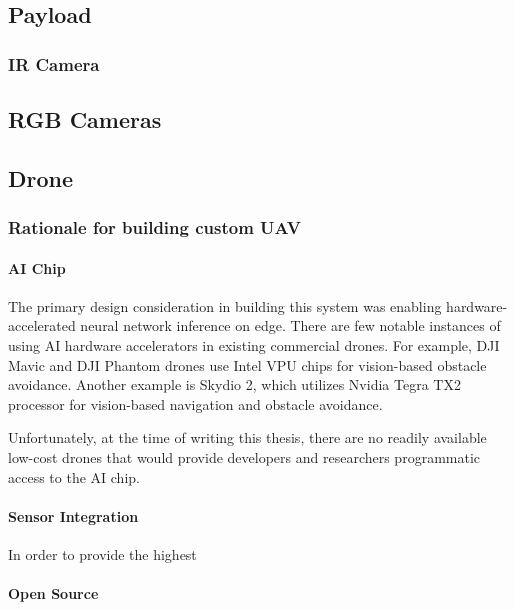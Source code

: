   \subsection{Payload}\label{sec:hardware:payload}

  \subsubsection{IR Camera}

  \subsection{RGB Cameras}

  

  \subsection{Drone}\label{sec:hardware:drone}

  \subsubsection{Rationale for building custom UAV}


  \paragraph{AI Chip}

  The primary design consideration in building this system was enabling hardware-accelerated neural network inference on edge.
  There are few notable instances of using AI hardware accelerators in existing commercial drones.
  For example, DJI Mavic and DJI Phantom drones use Intel VPU chips for vision-based obstacle avoidance. 
  Another example is Skydio 2, which utilizes Nvidia Tegra TX2 processor for vision-based navigation and obstacle avoidance.

  Unfortunately, at the time of writing this thesis, there are no readily available low-cost drones that would provide developers and researchers
  programmatic access to the AI chip. 

  \paragraph{Sensor Integration}

  In order to provide the highest 

  \paragraph{Open Source}
  
